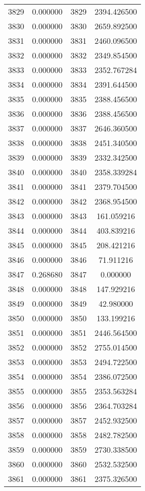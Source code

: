 \documentclass[12pt]{article}
\begin{document}
\begin{longtable}{@{}cccc@{}}
3829 & 0.000000 & 3829 & 2394.426500 \\
3830 & 0.000000 & 3830 & 2659.892500 \\
3831 & 0.000000 & 3831 & 2460.096500 \\
3832 & 0.000000 & 3832 & 2349.854500 \\
3833 & 0.000000 & 3833 & 2352.767284 \\
3834 & 0.000000 & 3834 & 2391.644500 \\
3835 & 0.000000 & 3835 & 2388.456500 \\
3836 & 0.000000 & 3836 & 2388.456500 \\
3837 & 0.000000 & 3837 & 2646.360500 \\
3838 & 0.000000 & 3838 & 2451.340500 \\
3839 & 0.000000 & 3839 & 2332.342500 \\
3840 & 0.000000 & 3840 & 2358.339284 \\
3841 & 0.000000 & 3841 & 2379.704500 \\
3842 & 0.000000 & 3842 & 2368.954500 \\
3843 & 0.000000 & 3843 & 161.059216 \\
3844 & 0.000000 & 3844 & 403.839216 \\
3845 & 0.000000 & 3845 & 208.421216 \\
3846 & 0.000000 & 3846 & 71.911216 \\
3847 & 0.268680 & 3847 & 0.000000 \\
3848 & 0.000000 & 3848 & 147.929216 \\
3849 & 0.000000 & 3849 & 42.980000 \\
3850 & 0.000000 & 3850 & 133.199216 \\
3851 & 0.000000 & 3851 & 2446.564500 \\
3852 & 0.000000 & 3852 & 2755.014500 \\
3853 & 0.000000 & 3853 & 2494.722500 \\
3854 & 0.000000 & 3854 & 2386.072500 \\
3855 & 0.000000 & 3855 & 2353.563284 \\
3856 & 0.000000 & 3856 & 2364.703284 \\
3857 & 0.000000 & 3857 & 2452.932500 \\
3858 & 0.000000 & 3858 & 2482.782500 \\
3859 & 0.000000 & 3859 & 2730.338500 \\
3860 & 0.000000 & 3860 & 2532.532500 \\
3861 & 0.000000 & 3861 & 2375.326500 \\

\end{longtable}
\end{document}
